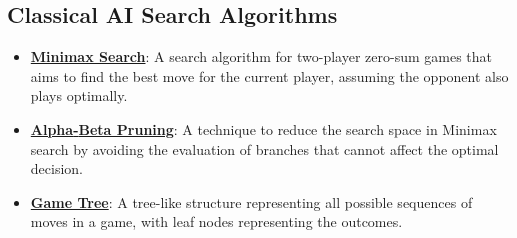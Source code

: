 \documentclass{article}%
\begin{document}
%
\subsection{Classical AI Search Algorithms}%
\label{subsec:ClassicalAISearchAlgorithms}%
\begin{itemize}[leftmargin=*]%
\item \href{https://purdue.brightspace.com/d2l/common/assets/pdfjs-d2l-dist/1.0.14-legacy/web/viewer.html?file=\%2Fcontent\%2Fenforced\%2F1095467-wl.202510.CS.24300.001\%2F02L2-Intro.pdf\%3Fou\%3D1095467\&lang=en-us\&container=d2l-fileviewer-rendered-pdf\&fullscreen=d2l-fileviewer-rendered-pdf-dialog\&height=667#page=22}{\textbf{Minimax Search}}: A search algorithm for two{-}player zero{-}sum games that aims to find the best move for the current player, assuming the opponent also plays optimally.%
\item \href{https://purdue.brightspace.com/d2l/common/assets/pdfjs-d2l-dist/1.0.14-legacy/web/viewer.html?file=\%2Fcontent\%2Fenforced\%2F1095467-wl.202510.CS.24300.001\%2F02L2-Intro.pdf\%3Fou\%3D1095467\&lang=en-us\&container=d2l-fileviewer-rendered-pdf\&fullscreen=d2l-fileviewer-rendered-pdf-dialog\&height=667#page=23}{\textbf{Alpha{-}Beta Pruning}}: A technique to reduce the search space in Minimax search by avoiding the evaluation of branches that cannot affect the optimal decision.%
\item \href{https://purdue.brightspace.com/d2l/common/assets/pdfjs-d2l-dist/1.0.14-legacy/web/viewer.html?file=\%2Fcontent\%2Fenforced\%2F1095467-wl.202510.CS.24300.001\%2F02L2-Intro.pdf\%3Fou\%3D1095467\&lang=en-us\&container=d2l-fileviewer-rendered-pdf\&fullscreen=d2l-fileviewer-rendered-pdf-dialog\&height=667#page=11}{\textbf{Game Tree}}: A tree{-}like structure representing all possible sequences of moves in a game, with leaf nodes representing the outcomes.%
\end{itemize}

%
\end{document}

